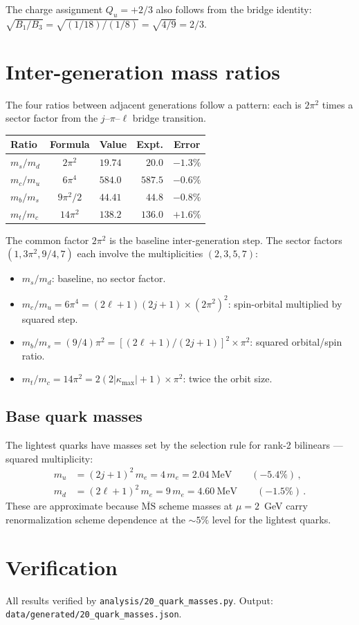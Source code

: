 \documentclass[11pt,letterpaper]{article}
\numberwithin{equation}{section}
\begin{document}
The charge assignment $Q_u = +2/3$ also follows from the bridge
identity: $\sqrt{B_1/B_3} = \sqrt{(1/18)/(1/8)} = \sqrt{4/9} = 2/3$.

\section{Inter-generation mass ratios}

The four ratios between adjacent generations follow a pattern:
each is $2\pi^2$ times a sector factor from the $j$--$\pi$--$\ell$
bridge transition.

\begin{center}
\begin{tabular}{lclrc}
\toprule
Ratio & Formula & Value & Expt. & Error \\
\midrule
$m_s/m_d$ & $2\pi^2$ & $19.74$ & $20.0$ & $-1.3\%$ \\
$m_c/m_u$ & $6\pi^4$ & $584.0$ & $587.5$ & $-0.6\%$ \\
$m_b/m_s$ & $9\pi^2/2$ & $44.41$ & $44.8$ & $-0.8\%$ \\
$m_t/m_c$ & $14\pi^2$ & $138.2$ & $136.0$ & $+1.6\%$ \\
\bottomrule
\end{tabular}
\end{center}

The common factor $2\pi^2$ is the baseline inter-generation step.
The sector factors $(1, 3\pi^2, 9/4, 7)$ each involve the
multiplicities $(2, 3, 5, 7)$:
\begin{itemize}
  \item $m_s/m_d$: baseline, no sector factor.
  \item $m_c/m_u = 6\pi^4 = (2\ell+1)(2j+1) \times (2\pi^2)^2$:
    spin-orbital multiplied by squared step.
  \item $m_b/m_s = (9/4)\pi^2 = [(2\ell+1)/(2j+1)]^2 \times \pi^2$:
    squared orbital/spin ratio.
  \item $m_t/m_c = 14\pi^2 = 2(2|\kappa_\mathrm{max}|+1) \times \pi^2$:
    twice the orbit size.
\end{itemize}

\subsection{Base quark masses}

The lightest quarks have masses set by the selection rule for rank-2
bilinears --- squared multiplicity:
\begin{align}
  m_u &= (2j+1)^2\,m_e = 4\,m_e = 2.04~\text{MeV}
    \qquad(-5.4\%)\,,\\
  m_d &= (2\ell+1)^2\,m_e = 9\,m_e = 4.60~\text{MeV}
    \qquad(-1.5\%)\,.
\end{align}
These are approximate because $\overline{\text{MS}}$ scheme masses at
$\mu = 2$~GeV carry renormalization scheme dependence at the $\sim5\%$
level for the lightest quarks.

\section{Verification}

All results verified by \texttt{analysis/20\_quark\_masses.py}.
Output: \texttt{data/generated/20\_quark\_masses.json}.
\end{document}
